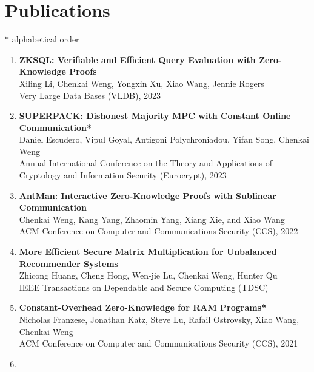 \documentclass[letterpaper,11pt]{article}
\newcommand{\resumeSubHeadingListStart}{\begin{itemize}[leftmargin=0.15in, label={}]}
\begin{document}
\section{Publications}
{\small $*$ alphabetical order}
\begin{enumerate}[leftmargin=0.20in]
  \item
          {\textbf{\small ZKSQL: Verifiable and Efficient Query Evaluation with Zero-Knowledge Proofs}} \\
		{\small Xiling Li, Chenkai Weng, Yongxin Xu, Xiao Wang, Jennie Rogers \vspace{-2pt}} \\
        {\small Very Large Data Bases (VLDB), 2023}
  \item
          {\textbf{\small SUPERPACK: Dishonest Majority MPC with Constant Online Communication*}} \\
		{\small Daniel Escudero, Vipul Goyal, Antigoni Polychroniadou, Yifan Song, Chenkai Weng \vspace{-2pt}} \\
        {\small Annual International Conference on the Theory and Applications of Cryptology and Information Security (Eurocrypt), 2023}
  \item
          {\textbf{\small AntMan: Interactive Zero-Knowledge Proofs with Sublinear Communication}} \\
		{\small Chenkai Weng, Kang Yang, Zhaomin Yang, Xiang Xie, and Xiao Wang \vspace{-2pt}} \\
		{\small ACM Conference on Computer and Communications Security (CCS), 2022}
  \item
          {\textbf{\small More Efficient Secure Matrix Multiplication for Unbalanced Recommender Systems}} \\
		{\small Zhicong Huang, Cheng Hong, Wen-jie Lu, Chenkai Weng, Hunter Qu \vspace{-2pt}} \\
		{\small IEEE Transactions on Dependable and Secure Computing (TDSC)}
  \item
          {\textbf{\small Constant-Overhead Zero-Knowledge for RAM Programs*}} \\
		{\small Nicholas Franzese, Jonathan Katz, Steve Lu, Rafail Ostrovsky, Xiao Wang, Chenkai Weng \vspace{-2pt}} \\
		{\small ACM Conference on Computer and Communications Security (CCS), 2021}
  \item

\end{enumerate}
\end{document}

